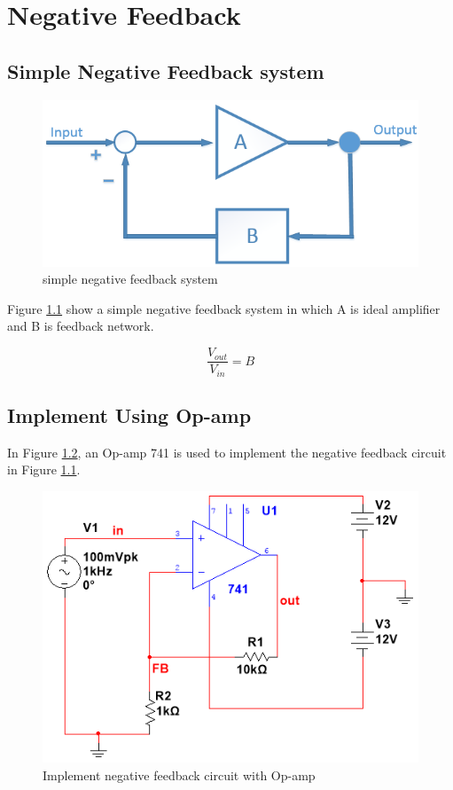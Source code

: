 \chapter{Negative Feedback}
\section{Simple Negative Feedback system}

\begin{figure}[htbp]
	\centering
	\includegraphics[scale=0.6]{"../Photo/Chap2/Feedback system"}
	\caption{simple negative feedback system}
	\label{fig:Feedback system}
\end{figure}

Figure \ref{fig:Feedback system} show a simple negative feedback system in which A is ideal amplifier and B is feedback network. 

\[  \frac{V_{out}}{V_{in}} = B  \] 
 



\section{Implement Using Op-amp}

In Figure \ref{fig:Op-amp feedback}, an Op-amp 741 is used to implement the negative feedback circuit in Figure \ref{fig:Feedback system}.

\begin{figure}[htbp]
	\centering
	\includegraphics[scale=0.7]{"../Photo/Chap2/Op-amp feedback"}
	\caption{Implement negative feedback circuit with Op-amp}
	\label{fig:Op-amp feedback}
\end{figure}




